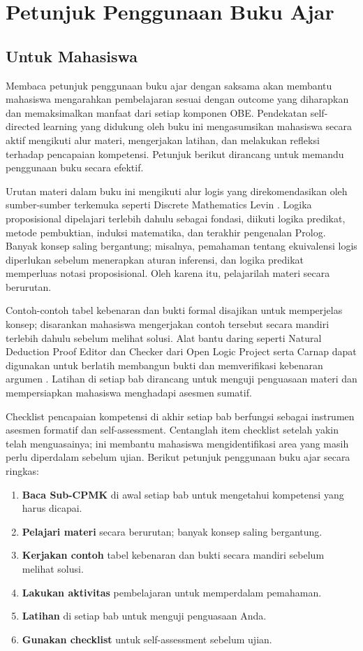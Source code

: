 \section{Petunjuk Penggunaan Buku Ajar}

\subsection{Untuk Mahasiswa}

Membaca petunjuk penggunaan buku ajar dengan saksama akan membantu mahasiswa mengarahkan pembelajaran sesuai dengan outcome yang diharapkan dan memaksimalkan manfaat dari setiap komponen OBE. Pendekatan self-directed learning yang didukung oleh buku ini mengasumsikan mahasiswa secara aktif mengikuti alur materi, mengerjakan latihan, dan melakukan refleksi terhadap pencapaian kompetensi. Petunjuk berikut dirancang untuk memandu penggunaan buku secara efektif.

Urutan materi dalam buku ini mengikuti alur logis yang direkomendasikan oleh sumber-sumber terkemuka seperti Discrete Mathematics Levin \cite{levin_discrete}. Logika proposisional dipelajari terlebih dahulu sebagai fondasi, diikuti logika predikat, metode pembuktian, induksi matematika, dan terakhir pengenalan Prolog. Banyak konsep saling bergantung; misalnya, pemahaman tentang ekuivalensi logis diperlukan sebelum menerapkan aturan inferensi, dan logika predikat memperluas notasi proposisional. Oleh karena itu, pelajarilah materi secara berurutan.

Contoh-contoh tabel kebenaran dan bukti formal disajikan untuk memperjelas konsep; disarankan mahasiswa mengerjakan contoh tersebut secara mandiri terlebih dahulu sebelum melihat solusi. Alat bantu daring seperti Natural Deduction Proof Editor dan Checker dari Open Logic Project serta Carnap dapat digunakan untuk berlatih membangun bukti dan memverifikasi kebenaran argumen \cite{proofs_checker,carnap}. Latihan di setiap bab dirancang untuk menguji penguasaan materi dan mempersiapkan mahasiswa menghadapi asesmen sumatif.

Checklist pencapaian kompetensi di akhir setiap bab berfungsi sebagai instrumen asesmen formatif dan self-assessment. Centanglah item checklist setelah yakin telah menguasainya; ini membantu mahasiswa mengidentifikasi area yang masih perlu diperdalam sebelum ujian. Berikut petunjuk penggunaan buku ajar secara ringkas:

\begin{enumerate}
  \item \textbf{Baca Sub-CPMK} di awal setiap bab untuk mengetahui kompetensi yang harus dicapai.
  \item \textbf{Pelajari materi} secara berurutan; banyak konsep saling bergantung.
  \item \textbf{Kerjakan contoh} tabel kebenaran dan bukti secara mandiri sebelum melihat solusi.
  \item \textbf{Lakukan aktivitas} pembelajaran untuk memperdalam pemahaman.
  \item \textbf{Latihan} di setiap bab untuk menguji penguasaan Anda.
  \item \textbf{Gunakan checklist} untuk self-assessment sebelum ujian.
\end{enumerate}

